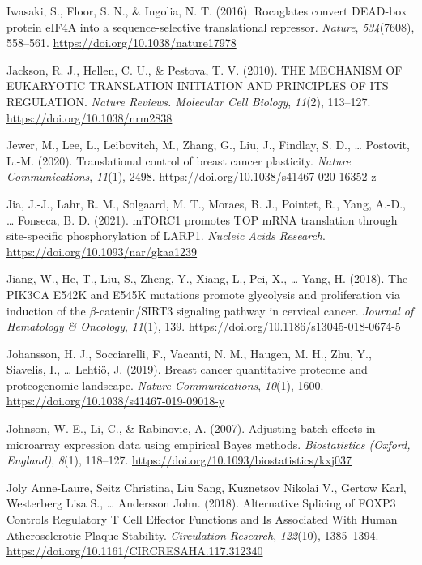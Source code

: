 \documentclass[12pt,openany]{book}
\begin{document}
\hypertarget{ref-Iwasaki2016}{}
Iwasaki, S., Floor, S. N., \& Ingolia, N. T. (2016). Rocaglates convert
DEAD-box protein eIF4A into a sequence-selective translational
repressor. \emph{Nature}, \emph{534}(7608), 558--561.
\url{https://doi.org/10.1038/nature17978}

\hypertarget{ref-Jackson2010a}{}
Jackson, R. J., Hellen, C. U., \& Pestova, T. V. (2010). THE MECHANISM
OF EUKARYOTIC TRANSLATION INITIATION AND PRINCIPLES OF ITS REGULATION.
\emph{Nature Reviews. Molecular Cell Biology}, \emph{11}(2), 113--127.
\url{https://doi.org/10.1038/nrm2838}

\hypertarget{ref-Jewer2020b}{}
Jewer, M., Lee, L., Leibovitch, M., Zhang, G., Liu, J., Findlay, S. D.,
\ldots{} Postovit, L.-M. (2020). Translational control of breast cancer
plasticity. \emph{Nature Communications}, \emph{11}(1), 2498.
\url{https://doi.org/10.1038/s41467-020-16352-z}

\hypertarget{ref-Jia2021}{}
Jia, J.-J., Lahr, R. M., Solgaard, M. T., Moraes, B. J., Pointet, R.,
Yang, A.-D., \ldots{} Fonseca, B. D. (2021). mTORC1 promotes TOP mRNA
translation through site-specific phosphorylation of LARP1.
\emph{Nucleic Acids Research}.
\url{https://doi.org/10.1093/nar/gkaa1239}

\hypertarget{ref-Jiang2018}{}
Jiang, W., He, T., Liu, S., Zheng, Y., Xiang, L., Pei, X., \ldots{}
Yang, H. (2018). The PIK3CA E542K and E545K mutations promote glycolysis
and proliferation via induction of the \(\beta\)-catenin/SIRT3 signaling
pathway in cervical cancer. \emph{Journal of Hematology \& Oncology},
\emph{11}(1), 139. \url{https://doi.org/10.1186/s13045-018-0674-5}

\hypertarget{ref-Johansson2019}{}
Johansson, H. J., Socciarelli, F., Vacanti, N. M., Haugen, M. H., Zhu,
Y., Siavelis, I., \ldots{} Lehtiö, J. (2019). Breast cancer quantitative
proteome and proteogenomic landscape. \emph{Nature Communications},
\emph{10}(1), 1600. \url{https://doi.org/10.1038/s41467-019-09018-y}

\hypertarget{ref-Johnson2007}{}
Johnson, W. E., Li, C., \& Rabinovic, A. (2007). Adjusting batch effects
in microarray expression data using empirical Bayes methods.
\emph{Biostatistics (Oxford, England)}, \emph{8}(1), 118--127.
\url{https://doi.org/10.1093/biostatistics/kxj037}

\hypertarget{ref-JolyAnne-Laure2018}{}
Joly Anne-Laure, Seitz Christina, Liu Sang, Kuznetsov Nikolai V., Gertow
Karl, Westerberg Lisa S., \ldots{} Andersson John. (2018). Alternative
Splicing of FOXP3 Controls Regulatory T Cell Effector Functions and Is
Associated With Human Atherosclerotic Plaque Stability.
\emph{Circulation Research}, \emph{122}(10), 1385--1394.
\url{https://doi.org/10.1161/CIRCRESAHA.117.312340}
\end{document}
